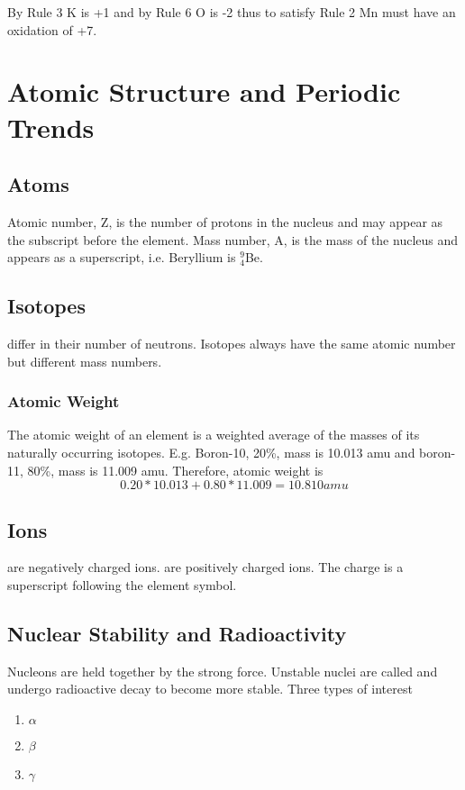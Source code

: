 \documentclass[../GChemReview.tex]{subfiles}
\begin{document}
  \begin{solution}
    By Rule 3 K is +1 and by Rule 6 O is -2 thus to satisfy Rule 2 Mn must have
    an oxidation of +7.
  \end{solution}

  \chapter{Atomic Structure and Periodic Trends}

  \section{Atoms}

  Atomic number, Z, is the number of protons in the nucleus and may appear as
  the subscript before the element. Mass number, A, is the mass of the nucleus
  and appears as a superscript, i.e. Beryllium is $ _{4}^{9} $Be.

  \section{Isotopes}

   differ in their number of neutrons. Isotopes always have the
  same atomic number but different mass numbers.

  \subsection{Atomic Weight}

  The atomic weight of an element is a weighted average of the masses of its
  naturally occurring isotopes. E.g. Boron-10, 20\%, mass is 10.013 amu and
  boron-11, 80\%, mass is 11.009 amu. Therefore, atomic weight is 
  \[ 0.20*10.013 + 0.80*11.009  = 10.810 amu \] 

  \section{Ions}

   are negatively charged ions.  are positively
  charged ions. The charge is a superscript following the element symbol.

  \section{Nuclear Stability and Radioactivity}

  Nucleons are held together by the strong force. Unstable nuclei are called
   and undergo radioactive decay to become more stable. Three
  types of interest
  \begin{enumerate}
    \item $ \alpha $
    \item $ \beta $
    \item $ \gamma $
  \end{enumerate}
\end{document}

